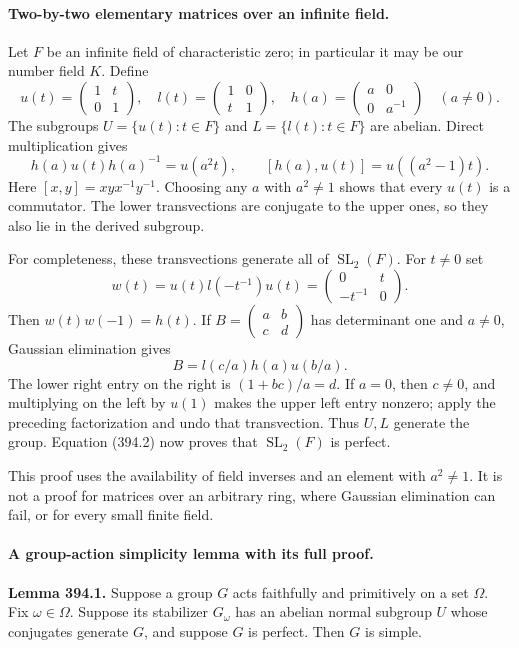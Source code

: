 \documentclass[11pt]{article}
\begin{document}
\paragraph{Two-by-two elementary matrices over an infinite field.}
Let $F$ be an infinite field of characteristic zero; in particular it
may be our number field $K$. Define
\[
 u(t)=\begin{pmatrix}1&t\\0&1\end{pmatrix},\quad
 l(t)=\begin{pmatrix}1&0\\t&1\end{pmatrix},\quad
 h(a)=\begin{pmatrix}a&0\\0&a^{-1}\end{pmatrix}\quad(a\ne0).
\]
The subgroups $U=\{u(t):t\in F\}$ and $L=\{l(t):t\in F\}$ are
abelian. Direct multiplication gives
\[
 h(a)u(t)h(a)^{-1}=u(a^2t),\qquad
 [h(a),u(t)]=u((a^2-1)t).
 \tag{394.2}
\]
Here $[x,y]=xyx^{-1}y^{-1}$. Choosing any $a$ with $a^2\ne1$ shows
that every $u(t)$ is a commutator. The lower transvections are conjugate
to the upper ones, so they also lie in the derived subgroup.

For completeness, these transvections generate all of
$\operatorname{SL}_2(F)$. For $t\ne0$ set
\[
 w(t)=u(t)l(-t^{-1})u(t)
     =\begin{pmatrix}0&t\\-t^{-1}&0\end{pmatrix}.
\]
Then $w(t)w(-1)=h(t)$. If
$B=\left(\begin{smallmatrix}a&b\\c&d\end{smallmatrix}\right)$
has determinant one and $a\ne0$, Gaussian elimination gives
\[
 B=l(c/a)h(a)u(b/a).
 \tag{394.3}
\]
The lower right entry on the right is $(1+bc)/a=d$. If $a=0$, then
$c\ne0$, and multiplying on the left by $u(1)$ makes the upper left
entry nonzero; apply the preceding factorization and undo that
transvection. Thus $U,L$ generate the group. Equation (394.2) now
proves that $\operatorname{SL}_2(F)$ is perfect.

This proof uses the availability of field inverses and an element with
$a^2\ne1$. It is not a proof for matrices over an arbitrary ring, where
Gaussian elimination can fail, or for every small finite field.

\paragraph{A group-action simplicity lemma with its full proof.}
\textbf{Lemma 394.1.} Suppose a group $G$ acts faithfully and primitively
on a set $\Omega$. Fix $\omega\in\Omega$. Suppose its stabilizer
$G_\omega$ has an abelian normal subgroup $U$ whose conjugates generate
$G$, and suppose $G$ is perfect. Then $G$ is simple.
\end{document}
